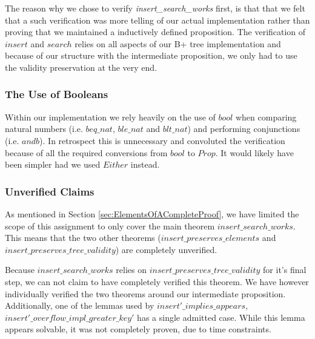 The reason why we chose to verify \textit{insert\_search\_works} first, is that that we felt that a such verification was more telling of our actual implementation rather than proving that we maintained a inductively defined proposition. The verification of $insert$ and $search$ relies on all aspects of our B+ tree implementation and because of our structure with the intermediate proposition, we only had to use the validity preservation at the very end.

\subsubsection{The Use of Booleans}

Within our implementation we rely heavily on the use of $bool$ when comparing natural numbers (i.e. $beq\_nat$, $ble\_nat$ and $blt\_nat$) and performing conjunctions (i.e. $andb$). In retrospect this is unnecessary and convoluted the verification because of all the required conversions from $bool$ to $Prop$. It would likely have been simpler had we used $Either$ instead.

\subsubsection{Unverified Claims}

As mentioned in Section \ref{sec:ElementsOfACompleteProof}, we have limited the scope of this assignment to only cover the main theorem $insert\_search\_works$. This means that the two other theorems ($insert\allowbreak{}\_preserves\allowbreak{}\_elements$ and $insert\allowbreak{}\_preserves\allowbreak{}\_tree\allowbreak{}\_validity$) are completely unverified.

Because $insert\_search\_works$ relies on $insert\_preserves\_tree\_validity$ for it's final step, we can not claim to have completely verified this theorem. We have however individually verified the two theorems around our intermediate proposition. Additionally, one of the lemmas used by $insert'\_implies\_appears$, $insert'\_overflow\_impl\_greater\_key'$ has a single admitted case. While this lemma appears solvable, it was not completely proven, due to time constraints.
